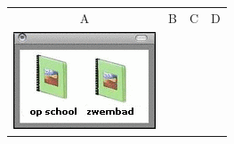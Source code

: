 \documentclass[12pt]{article}
\begin{document}
\begin{minipage}{\textwidth}
			\begin{table}[H]
				\begin{tabulary}{\linewidth}{|C|C|C|C|}
					\hline
					A & B & C & D \\
					\includegraphics[width=\linewidth]{option1} &

\end{tabulary}
\end{table}
\end{minipage}
\end{document}

